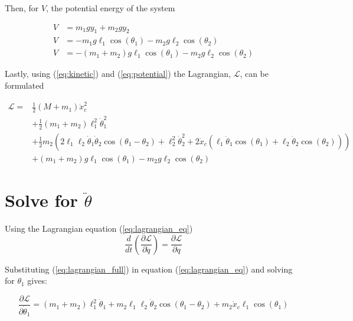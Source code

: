 \documentclass[10pt]{article}
\begin{document}
    Then, for $V$, the potential energy of the system

    \begin{equation} \label{eq:potential}
        \begin{aligned}
        V &= m_1gy_1 + m_2gy_2     \\
        V &= -m_1g\ell_1\cos(\theta_1) - m_2g\ell_2\cos(\theta_2)\\
        V &= -(m_1+m_2)g\ell_1\cos(\theta_1) - m_2g\ell_2\cos(\theta_2)
        \end{aligned}
    \end{equation}
    
    Lastly, using (\ref{eq:kinetic}) and (\ref{eq:potential}) the 
    Lagrangian, $\mathcal{L}$, can be formulated
    
    \begin{equation} \label{eq:lagrangian_full}
        \begin{aligned}
            \mathcal{L} = & \frac{1}{2}(M + m_1) \dot x_c^2 \\
            & + \frac{1}{2}(m_1 + m_2)\ell_1^2\dot\theta_1^2 \\
            & + \frac{1}{2} m_2 \left(2\ell_1\ell_2 \dot\theta_1 \dot\theta_2 \cos(\theta_1 - \theta_2) + \ell_2^2\dot\theta_2^2 + 2\dot x_c(\ell_1 \dot \theta_1 \cos(\theta_1) + \ell_2 \dot \theta_2 \cos(\theta_2))\right) \\
            & + (m_1 + m_2)g\ell_1\cos(\theta_1) - m_2g\ell_2\cos(\theta_2)
        \end{aligned}
    \end{equation}
    

    \pagebreak
    \section{Solve for $\ddot \theta$}

    Using the Lagrangian equation (\ref{eq:lagrangian_eq})
    \begin{equation} \label{eq:lagrangian_eq}
        \frac{d}{dt} \left(\frac{\partial \mathcal{L}}{\partial \dot q} \right) = 
        \frac{\partial \mathcal{L}}{\partial q}
    \end{equation}

    Substituting (\ref{eq:lagrangian_full}) in equation (\ref{eq:lagrangian_eq}) and solving for $\theta_1$ gives:

    \begin{equation} \label{eq: lagrange Step1}
        \frac{\partial \mathcal{L}}{\partial \dot\theta_1} = 
         (m_1 + m_2)\ell_1^2\dot\theta_1 + m_2\ell_1\ell_2\dot\theta_2\cos(\theta_1 - \theta_2) + m_2\dot x_c\ell_1\cos(\theta_1)
    \end{equation}
\end{document}
